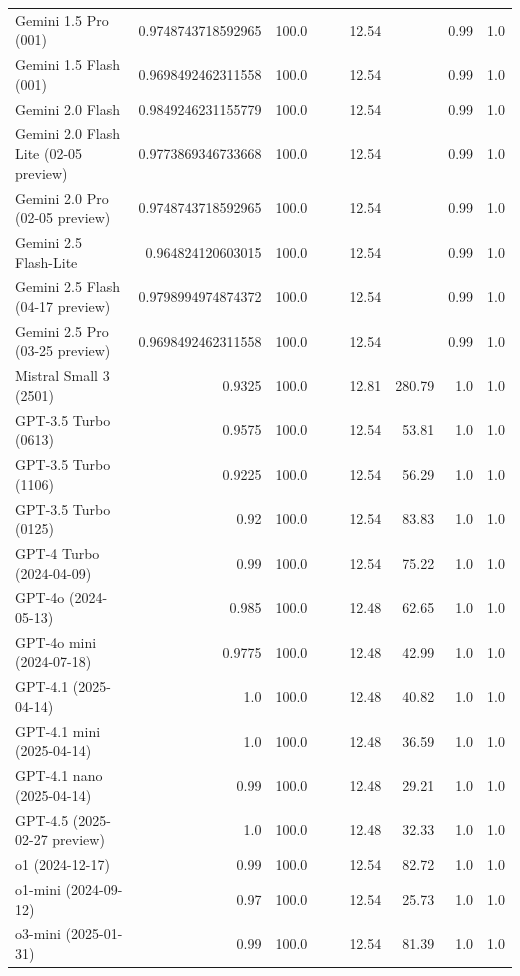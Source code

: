 \begin{table}[htp]
{\begin{tabular}{lrrrrrrrr}
Gemini 1.5 Pro (001) & 0.9748743718592965 & 100.0 &  &  & 12.54 &  & 0.99 & 1.0 \\
Gemini 1.5 Flash (001) & 0.9698492462311558 & 100.0 &  &  & 12.54 &  & 0.99 & 1.0 \\
Gemini 2.0 Flash & 0.9849246231155779 & 100.0 &  &  & 12.54 &  & 0.99 & 1.0 \\
Gemini 2.0 Flash Lite (02-05 preview) & 0.9773869346733668 & 100.0 &  &  & 12.54 &  & 0.99 & 1.0 \\
Gemini 2.0 Pro (02-05 preview) & 0.9748743718592965 & 100.0 &  &  & 12.54 &  & 0.99 & 1.0 \\
Gemini 2.5 Flash-Lite & 0.964824120603015 & 100.0 &  &  & 12.54 &  & 0.99 & 1.0 \\
Gemini 2.5 Flash (04-17 preview) & 0.9798994974874372 & 100.0 &  &  & 12.54 &  & 0.99 & 1.0 \\
Gemini 2.5 Pro (03-25 preview) & 0.9698492462311558 & 100.0 &  &  & 12.54 &  & 0.99 & 1.0 \\
Mistral Small 3 (2501) & 0.9325 & 100.0 &  &  & 12.81 & 280.79 & 1.0 & 1.0 \\
GPT-3.5 Turbo (0613) & 0.9575 & 100.0 &  &  & 12.54 & 53.81 & 1.0 & 1.0 \\
GPT-3.5 Turbo (1106) & 0.9225 & 100.0 &  &  & 12.54 & 56.29 & 1.0 & 1.0 \\
GPT-3.5 Turbo (0125) & 0.92 & 100.0 &  &  & 12.54 & 83.83 & 1.0 & 1.0 \\
GPT-4 Turbo (2024-04-09) & 0.99 & 100.0 &  &  & 12.54 & 75.22 & 1.0 & 1.0 \\
GPT-4o (2024-05-13) & 0.985 & 100.0 &  &  & 12.48 & 62.65 & 1.0 & 1.0 \\
GPT-4o mini (2024-07-18) & 0.9775 & 100.0 &  &  & 12.48 & 42.99 & 1.0 & 1.0 \\
GPT-4.1 (2025-04-14) & 1.0 & 100.0 &  &  & 12.48 & 40.82 & 1.0 & 1.0 \\
GPT-4.1 mini (2025-04-14) & 1.0 & 100.0 &  &  & 12.48 & 36.59 & 1.0 & 1.0 \\
GPT-4.1 nano (2025-04-14) & 0.99 & 100.0 &  &  & 12.48 & 29.21 & 1.0 & 1.0 \\
GPT-4.5 (2025-02-27 preview) & 1.0 & 100.0 &  &  & 12.48 & 32.33 & 1.0 & 1.0 \\
o1 (2024-12-17) & 0.99 & 100.0 &  &  & 12.54 & 82.72 & 1.0 & 1.0 \\
o1-mini (2024-09-12) & 0.97 & 100.0 &  &  & 12.54 & 25.73 & 1.0 & 1.0 \\
o3-mini (2025-01-31) & 0.99 & 100.0 &  &  & 12.54 & 81.39 & 1.0 & 1.0 \\

\end{tabular}}
\end{table}
